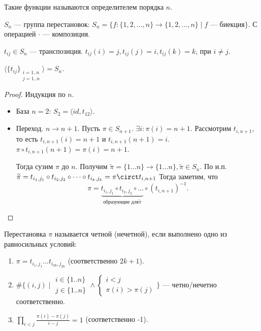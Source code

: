 \begin{definition}
    Такие функции называются определителем порядка $n$.
\end{definition}

\begin{definition}
    $S_n$ --- группа перестановок:  $S_n = \{ f\! :\{1, 2,\ldots, n\} \to \{1, 2,\ldots, n\} \mid f\text{ --- биекция}\}$. С операцией $\cdot$ --- композиция.
\end{definition}
\begin{definition}
    $t_{ij} \in S_n$ --- транспозиция.  $t_{ij}(i) = j, t_{ij}(j) = i, t_{ij}(k) = k$, при $i \neq j$. 
\end{definition}
\begin{statement}
    $\langle\{t_{ij}\}_{\substack{i=1..n\\j=1..n}}\rangle = S_n$.
\end{statement}
\begin{proof}
    Индукция по $n$.
\begin{itemize}
    
    \item База $n=2$:  $S_2 = \langle id, t_{12}\rangle$. 
    \item Переход. $n \to n +1$.  Пусть $\pi \in S_{n+1}$.  $\exists i: \pi(i) = n + 1$. Рассмотрим  $t_{i, n+1}$, то есть $t_{i, n + 1}(i) = n + 1$ и $t_{i, n + 1}(n+1) = i$. $\pi \circ t_{i, n + 1}(n+1) = \pi(i) = n + 1$.

        Тогда сузим  $\pi$ до  $n$. Получим  $\widetilde{\pi}=\{1\ldots n\} \to \{1 \ldots n\}, \widetilde{\pi} \in S_n$. По и.п. $\widetilde{\pi} = t_{i_1,j_1} \circ t_{i_2, j_2} \circ \cdots \circ t_{i_{k}, j_k} = \pi \circt t_{i, n+1}$ Тогда заметим, что \[\pi = \underbrace{t_{i_1, j_1} \circ t_{i_2, j_2} \circ \ldots}_{\text{образующие для} \widetilde{\pi}} \circ (t_{i, n+1})^{-1}.\]
\end{itemize}
\end{proof}
\begin{definition}
    Перестановка $\pi$ называется четной (нечетной), если выполнено одно из равносильных условий:
    \begin{enumerate}
        \item $\pi = t_{i_1, j_1} \ldots t_{i_{2k}, j_{2k}}$ (соответственно $2k+1$).
        \item $\#\{(i, j) \mid \substack{i \in \{1..n\} \\ j \in \{1..n\}} \land \begin{cases} i < j \\ \pi(i) > \pi(j) \end{cases} \}$ --- четно/нечетно соответственно.
        \item  $\prod\limits_{i<j} \frac{\pi(i) - \pi(j)}{i-j} = 1$ (соответственно -1).
    \end{enumerate}

\end{definition}
